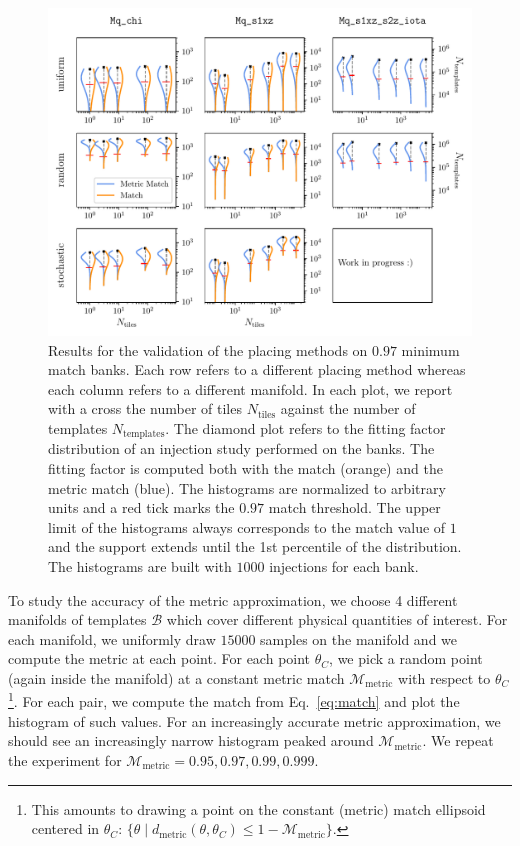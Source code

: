 \documentclass[twocolumn,showpacs,preprintnumbers,nofootinbib,prd,
superscriptaddress,10pt]{revtex4-2}
\begin{document}
\begin{figure}[th!]
	\centering
	\includegraphics[width=.85\textwidth,keepaspectratio]{placing_validation}
	\caption{Results for the validation of the placing methods on $0.97$ minimum match banks. Each row refers to a different placing method whereas each column refers to a different manifold. In each plot, we report with a cross the number of tiles $N_{\text{tiles}}$ against the number of templates $N_{\text{templates}}$.
	The diamond plot refers to the fitting factor distribution of an injection study performed on the banks. The fitting factor is computed both with the match (orange) and the metric match (blue). The histograms are normalized to arbitrary units and a red tick marks the $0.97$ match threshold. The upper limit of the histograms always corresponds to the match value of $1$ and the support extends until the 1st percentile of the distribution.
	The histograms are built with $1000$ injections for each bank.
	}
	\label{fig:placing_validation}
\end{figure}

To study the accuracy of the metric approximation, we choose 4 different manifolds of templates $\mathcal{B}$ which cover different physical quantities of interest. For each manifold, we uniformly draw $15000$ samples on the manifold and we compute the metric at each point.
For each point $\theta_C$, we pick a random point (again inside the manifold) at a constant metric match $\mathcal{M}_{\text{metric}}$ with respect to $\theta_C$\footnote{
This amounts to drawing a point on the constant (metric) match ellipsoid centered in
$\theta_C$: $\{\theta \; | \; d_{\text{metric}}(\theta,\theta_C) \leq 1-\mathcal{M}_{\text{metric}} \}$.
}.
For each pair, we compute the match from Eq.~\eqref{eq:match} and plot the histogram of such values. For an increasingly accurate metric approximation, we should see an increasingly narrow histogram peaked around $\mathcal{M}_{\text{metric}}$.
We repeat the experiment for $\mathcal{M}_{\text{metric}} = 0.95, 0.97, 0.99, 0.999$.
\end{document}
